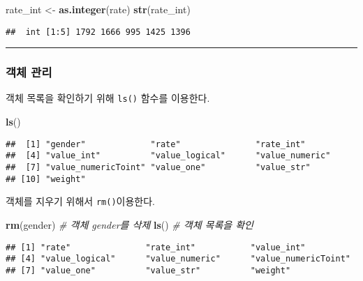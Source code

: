 \documentclass[
]{article}
\newenvironment{Shaded}{\begin{snugshade}}{\end{snugshade}}
\newcommand{\CommentTok}[1]{\textcolor[rgb]{0.56,0.35,0.01}{\textit{#1}}}
\newcommand{\FunctionTok}[1]{\textcolor[rgb]{0.13,0.29,0.53}{\textbf{#1}}}
\newcommand{\NormalTok}[1]{#1}
\newcommand{\OtherTok}[1]{\textcolor[rgb]{0.56,0.35,0.01}{#1}}
\begin{document}
\begin{Shaded}
\begin{Highlighting}[]
\NormalTok{rate\_int }\OtherTok{\textless{}{-}} \FunctionTok{as.integer}\NormalTok{(rate)}
\FunctionTok{str}\NormalTok{(rate\_int)}
\end{Highlighting}
\end{Shaded}

\begin{verbatim}
##  int [1:5] 1792 1666 995 1425 1396
\end{verbatim}

\begin{center}\rule{0.5\linewidth}{0.5pt}\end{center}

\hypertarget{uxac1duxccb4-uxad00uxb9ac}{%
\subsubsection{객체 관리}\label{uxac1duxccb4-uxad00uxb9ac}}

객체 목록을 확인하기 위해 \texttt{ls()} 함수를 이용한다.

\begin{Shaded}
\begin{Highlighting}[]
\FunctionTok{ls}\NormalTok{()}
\end{Highlighting}
\end{Shaded}

\begin{verbatim}
##  [1] "gender"             "rate"               "rate_int"          
##  [4] "value_int"          "value_logical"      "value_numeric"     
##  [7] "value_numericToint" "value_one"          "value_str"         
## [10] "weight"
\end{verbatim}

객체를 지우기 위해서 \texttt{rm()}이용한다.

\begin{Shaded}
\begin{Highlighting}[]
\FunctionTok{rm}\NormalTok{(gender) }\CommentTok{\# 객체 gender를 삭제}
\FunctionTok{ls}\NormalTok{() }\CommentTok{\# 객체 목록을 확인}
\end{Highlighting}
\end{Shaded}

\begin{verbatim}
## [1] "rate"               "rate_int"           "value_int"         
## [4] "value_logical"      "value_numeric"      "value_numericToint"
## [7] "value_one"          "value_str"          "weight"
\end{verbatim}
\end{document}
